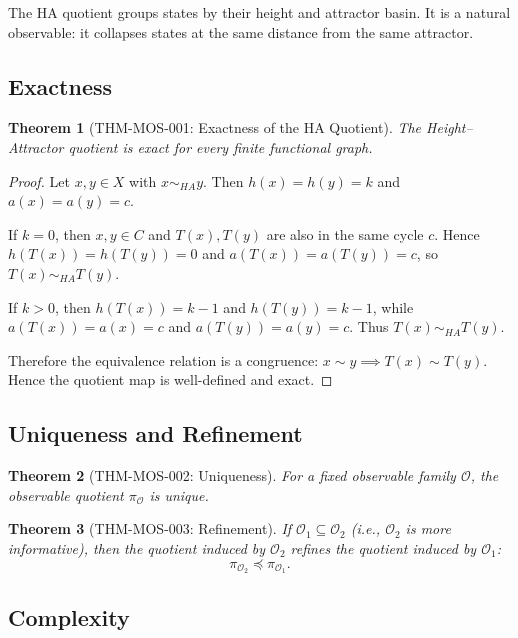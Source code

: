 \documentclass[11pt, a4paper]{article}
\newtheorem{theorem}{Theorem}[section]
\theoremstyle{definition}
\theoremstyle{remark}
\begin{document}
The HA quotient groups states by their height and attractor basin. It is a natural observable: it collapses states at the same distance from the same attractor.

\subsection{Exactness}

\begin{theorem}[THM-MOS-001: Exactness of the HA Quotient]
The Height–Attractor quotient is exact for every finite functional graph.
\end{theorem}

\begin{proof}
Let \(x, y \in X\) with \(x \sim_{HA} y\). Then \(h(x) = h(y) = k\) and \(a(x) = a(y) = c\).

If \(k = 0\), then \(x, y \in C\) and \(T(x), T(y)\) are also in the same cycle \(c\). Hence \(h(T(x)) = h(T(y)) = 0\) and \(a(T(x)) = a(T(y)) = c\), so \(T(x) \sim_{HA} T(y)\).

If \(k > 0\), then \(h(T(x)) = k-1\) and \(h(T(y)) = k-1\), while \(a(T(x)) = a(x) = c\) and \(a(T(y)) = a(y) = c\). Thus \(T(x) \sim_{HA} T(y)\).

Therefore the equivalence relation is a congruence: \(x \sim y \implies T(x) \sim T(y)\). Hence the quotient map is well-defined and exact.
\end{proof}

\subsection{Uniqueness and Refinement}

\begin{theorem}[THM-MOS-002: Uniqueness]
For a fixed observable family \(\mathcal O\), the observable quotient \(\pi_{\mathcal O}\) is unique.
\end{theorem}

\begin{theorem}[THM-MOS-003: Refinement]
If \(\mathcal O_1 \subseteq \mathcal O_2\) (i.e., \(\mathcal O_2\) is more informative), then the quotient induced by \(\mathcal O_2\) refines the quotient induced by \(\mathcal O_1\):
\[
\pi_{\mathcal O_2} \preceq \pi_{\mathcal O_1}.
\]
\end{theorem}

\subsection{Complexity}
\end{document}

